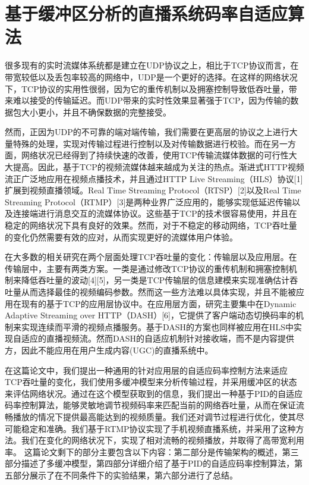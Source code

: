 \chapter{基于缓冲区分析的直播系统码率自适应算法}

很多现有的实时流媒体系统都是建立在UDP协议之上，相比于TCP协议而言，在带宽较低以及丢包率较高的网络中，UDP是一个更好的选择。在这样的网络状况下，TCP协议的实用性很弱，因为它的重传机制以及拥塞控制导致低吞吐量，带来难以接受的传输延迟。而UDP带来的实时性效果显著强于TCP，因为传输的数据包大小更小，并且不确保数据的完整接受。

然而，正因为UDP的不可靠的端对端传输，我们需要在更高层的协议之上进行大量特殊的处理，实现对传输过程进行控制以及对传输数据进行校验。而在另一方面，网络状况已经得到了持续快速的改善，使用TCP传输流媒体数据的可行性大大提高。因此，基于TCP的视频流媒体越来越成为关注的热点。渐进式HTTP视频流正广泛地应用在视频点播技术，并且通过HTTP Live Streaming（HLS）协议[1]扩展到视频直播领域。Real Time Streaming Protocol（RTSP）[2]以及Real Time Streaming Protocol（RTMP）[3]是两种业界广泛应用的，能够实现低延迟传输以及连接端进行消息交互的流媒体协议。这些基于TCP的技术很容易使用，并且在稳定的网络状况下具有良好的效果。然而，对于不稳定的移动网络，TCP吞吐量的变化仍然需要有效的应对，从而实现更好的流媒体用户体验。

在大多数的相关研究在两个层面处理TCP吞吐量的变化：传输层以及应用层。在传输层中，主要有两类方案。一类是通过修改TCP协议的重传机制和拥塞控制机制来降低吞吐量的波动[4][5]，另一类是TCP传输层的信息建模来实现准确估计吞吐量从而选择最佳的视频编码参数。然而这一些方法难以具体实现，并且不能被应用在现有的基于TCP的应用层协议中。在应用层方面，研究主要集中在Dynamic Adaptive Streaming over HTTP（DASH）[6]，它提供了客户端动态切换码率的机制来实现连续而平滑的视频点播服务。基于DASH的方案也同样被应用在HLS中实现自适应的直播视频流。然而DASH的自适应机制针对接收端，而不是内容提供方，因此不能应用在用户生成内容(UGC)的直播系统中。

在这篇论文中，我们提出一种通用的针对应用层的自适应码率控制方法来适应TCP吞吐量的变化，我们使用多缓冲模型来分析传输过程，并采用缓冲区的状态来评估网络状况。通过在这个模型获取到的信息，我们提出一种基于PID的自适应码率控制算法，能够灵敏地调节视频码率来匹配当前的网络吞吐量，从而在保证流畅播放的情况下提供最高能达到的视频质量。我们还对调节过程进行优化，使其尽可能稳定和准确。我们基于RTMP协议实现了手机视频直播系统，并采用了这种方法。我们在变化的网络状况下，实现了相对流畅的视频播放，并取得了高带宽利用率。
这篇论文剩下的部分主要包含以下内容：第二部分是传输架构的概述，第三部分描述了多缓冲模型，第四部分详细介绍了基于PID的自适应码率控制算法，第五部分展示了在不同条件下的实验结果，第六部分进行了总结。

